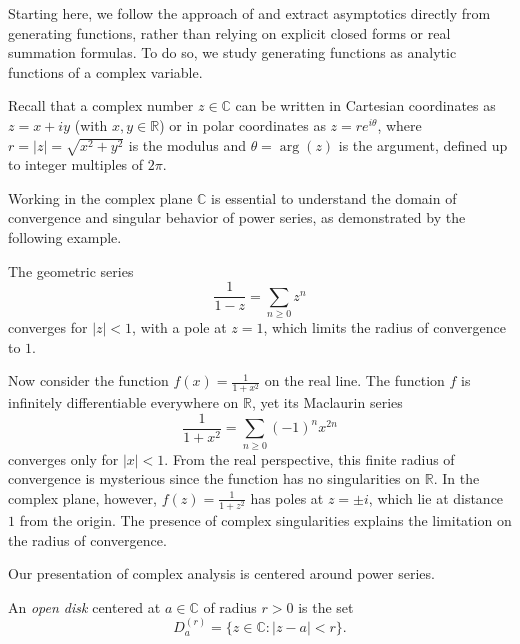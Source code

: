 Starting here, we follow the approach of \cite{Melczer2021} and extract asymptotics directly from generating functions, rather than relying on explicit closed forms or real summation formulas.
To do so, we study generating functions as analytic functions of a complex variable.

Recall that a complex number \(z \in \mathbb{C}\) can be written in Cartesian coordinates as \(z = x + iy\) (with \(x, y \in \mathbb{R}\)) or in polar coordinates as \(z = r e^{i\theta}\), where \(r = |z| = \sqrt{x^2 + y^2}\) is the modulus and \(\theta = \arg(z)\) is the argument, defined up to integer multiples of \(2\pi\).

Working in the complex plane \(\mathbb{C}\) is essential to understand the domain of convergence and singular behavior of power series, as demonstrated by the following example.

\begin{example}
    The geometric series
    \[
        \frac{1}{1-z} = \sum_{n \ge 0} z^n
    \]
    converges for \(|z| < 1\), with a pole at \(z = 1\), which limits the radius of convergence to \(1\).
    
    Now consider the function \(f(x) = \frac{1}{1+x^2}\) on the real line. The function \(f\) is infinitely differentiable everywhere on \(\mathbb{R}\), yet its Maclaurin series
    \[
        \frac{1}{1+x^2} = \sum_{n \ge 0} (-1)^n x^{2n}
    \]
    converges only for \(|x| < 1\). From the real perspective, this finite radius of convergence is mysterious since the function has no singularities on \(\mathbb{R}\).
    In the complex plane, however, \(f(z) = \frac{1}{1+z^2}\) has poles at \(z = \pm i\), which lie at distance \(1\) from the origin. The presence of complex singularities explains the limitation on the radius of convergence.
\end{example}

Our presentation of complex analysis is centered around power series.

\begin{definition}
An \emph{open disk} centered at \(a \in \mathbb{C}\) of radius \(r > 0\) is the set
\[
    D_a^{(r)} = \{ z \in \mathbb{C} : |z - a| < r \}.
\]
\end{definition}

